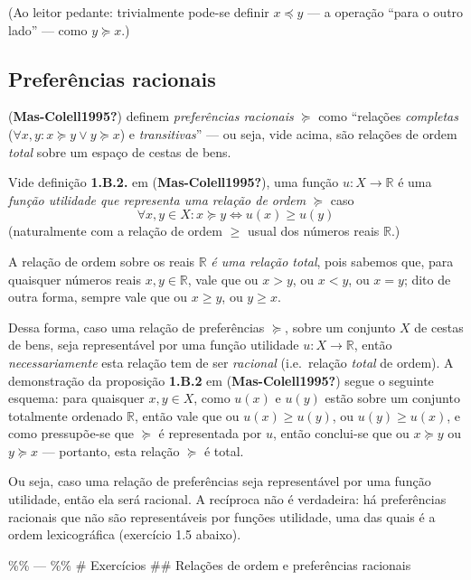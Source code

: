 \documentclass[12pt]{article}
\begin{document}
(Ao leitor pedante: trivialmente pode-se definir \(x \preceq y\) --- a
operação ``para o outro lado'' --- como \(y \succeq x\).)

\hypertarget{preferuxeancias-racionais}{%
\subsection{Preferências racionais}\label{preferuxeancias-racionais}}

(\textbf{Mas-Colell1995?}) definem \emph{preferências racionais}
\(\succeq\) como ``relações \emph{completas}
(\(\forall x,y: x \succeq y \lor y \succeq x\)) e \emph{transitivas}''
--- ou seja, vide acima, são relações de ordem \emph{total} sobre um
espaço de cestas de bens.

Vide definição \textbf{1.B.2.} em (\textbf{Mas-Colell1995?}), uma função
\(u: X \to \mathbb{R}\) é uma \emph{função utilidade que representa uma
relação de ordem} \(\succeq\) caso \[
\forall x, y \in X: x \succeq y \iff u(x) \geq u(y)
\] (naturalmente com a relação de ordem \(\geq\) usual dos números reais
\(\mathbb{R}\).)

A relação de ordem sobre os reais \(\mathbb{R}\) \emph{é uma relação
total}, pois sabemos que, para quaisquer números reais
\(x, y \in \mathbb{R}\), vale que ou \(x>y\), ou \(x<y\), ou \(x=y\);
dito de outra forma, sempre vale que ou \(x \geq y\), ou \(y\geq x\).

Dessa forma, caso uma relação de preferências \(\succeq\), sobre um
conjunto \(X\) de cestas de bens, seja representável por uma função
utilidade \(u:X \to \mathbb{R}\), então \emph{necessariamente} esta
relação tem de ser \emph{racional} (i.e.~relação \emph{total} de ordem).
A demonstração da proposição \textbf{1.B.2} em
(\textbf{Mas-Colell1995?}) segue o seguinte esquema: para quaisquer
\(x, y \in X\), como \(u(x)\) e \(u(y)\) estão sobre um conjunto
totalmente ordenado \(\mathbb{R}\), então vale que ou
\(u(x) \geq u(y)\), ou \(u(y) \geq u(x)\), e como pressupõe-se que
\(\succeq\) é representada por \(u\), então conclui-se que ou
\(x \succeq y\) ou \(y \succeq x\) --- portanto, esta relação
\(\succeq\) é total.

Ou seja, caso uma relação de preferências seja representável por uma
função utilidade, então ela será racional. A recíproca não é verdadeira:
há preferências racionais que não são representáveis por funções
utilidade, uma das quais é a ordem lexicográfica (exercício 1.5 abaixo).

\%\% --- \%\% \# Exercícios \#\# Relações de ordem e preferências
racionais
\end{document}
